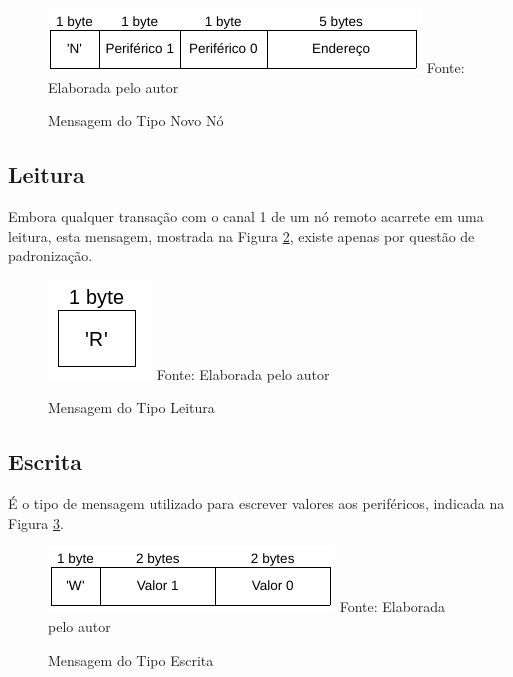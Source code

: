 {\begin{figure}[h!]
	\caption{Mensagem do Tipo Novo Nó}
	\centering
	\includegraphics[scale=0.5]{../images/mensagem_novo_no.png}
	\hspace{\linewidth}
	Fonte: Elaborada pelo autor
	\label{figura:message_new_node}
\end{figure}

\subsection{Leitura}
Embora qualquer transação com o canal 1 de um nó remoto acarrete em uma leitura, esta mensagem, mostrada na Figura
\ref{figura:message_read}, existe apenas por questão de padronização.

\begin{figure}[h!]
	\caption{Mensagem do Tipo Leitura}
	\centering
	\includegraphics[scale=0.35]{../images/mensagem_leitura.png}
	\hspace{\linewidth}
	Fonte: Elaborada pelo autor
	\label{figura:message_read}
\end{figure}

\subsection{Escrita}
É o tipo de mensagem utilizado para escrever valores aos periféricos, indicada na Figura
\ref{figura:message_esc}.

\begin{figure}[h!]
	\caption{Mensagem do Tipo Escrita}
	\centering
	\includegraphics[scale=0.5]{../images/mensagem_escrita.png}
	\hspace{\linewidth}
	Fonte: Elaborada pelo autor
	\label{figura:message_esc}
\end{figure}

}
